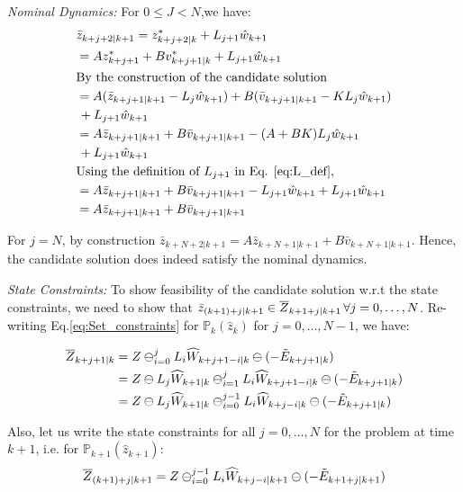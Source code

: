 \textit{ Nominal Dynamics:} For $0\leq J<N$,we have:
\begin{subequations}
\begin{align}
&\bar{z}_{k+j+2|k+1} = z^{*}_{k+j+2|k} + L_{j+1}\hat{w}_{k+1} \\
&= Az^{*}_{k+j+1}+Bv^{*}_{k+j+1|k} + L_{j+1}\hat{w}_{k+1} \\
& \text{By the construction of the candidate solution} \nonumber \\
& = A(\bar{z}_{k+j+1|k+1}-L_j\hat{w}_{k+1}) + B(\bar{v}_{k+j+1|k+1} - KL_j \hat{w}_{k+1}) \nonumber \\
&\, + L_{j+1}\hat{w}_{k+1} \\
& = A\bar{z}_{k+j+1|k+1} + B\bar{v}_{k+j+1|k+1} -(A+BK)L_j\hat{w}_{k+1} \nonumber \\
&\,+ L_{j+1}\hat{w}_{k+1} \\
&\text{Using the definition of $L_{j+1}$ in Eq. \ref{eq:L_def},} \nonumber \\
& = A\bar{z}_{k+j+1|k+1} + B\bar{v}_{k+j+1|k+1} - L_{j+1}\hat{w}_{k+1} + L_{j+1}\hat{w}_{k+1} \\
& = A\bar{z}_{k+j+1|k+1} + B\bar{v}_{k+j+1|k+1}
\end{align}
\end{subequations}

For $j=N$, by construction $\bar{z}_{k+N+2|k+1} = A\bar{z}_{k+N+1|k+1} + B\bar{v}_{k+N+1|k+1}$. Hence, the candidate solution does indeed satisfy the nominal dynamics.

\textit{State Constraints:} To show feasibility of the candidate solution w.r.t the state constraints, we need to show that $\bar{z}_{(k+1)+j|k+1}\in \overline{Z}_{k+1+j|k+1}\, \forall j=0,\dotsc,N$. Re-writing Eq.\ref{eq:Set_constraints} for $\mathbb{P}_{k}(\hat{z}_k)$ for $j=0,\dotsc,N-1$, we have:

\begin{subequations}
\label{eq:redef_Zj}
\begin{align}
\overline{Z}_{k+j+1|k} &= Z \ominus_{i=0}^{j}L_i\widehat{W}_{k+j+1-i|k} \ominus (-\tilde{E}_{k+j+1|k}) \\
 &= Z \ominus L_j \widehat{W}_{k+1|k} \ominus_{i=1}^{j}L_i\widehat{W}_{k+j+1-i|k} \ominus (-\tilde{E}_{k+j+1|k})\\
 &= Z \ominus L_j \widehat{W}_{k+1|k} \ominus_{i=0}^{j-1}L_i\widehat{W}_{k+j-i|k} \ominus (-\tilde{E}_{k+j+1|k})
\end{align}
\end{subequations}


Also, let us write the state constraints for all $j=0,\dotsc,N$ for the problem at time $k+1$, i.e. for $\mathbb{P}_{k+1}(\hat{z}_{k+1})$:
\begin{equation}
\label{eq:redef_Zjp1}
\overline{Z}_{(k+1)+j|k+1} = Z \ominus_{i=0}^{j-1}L_i\widehat{W}_{k+j-i|k+1} \ominus (-\tilde{E}_{k+1+j|k+1}) \\
\end{equation}

